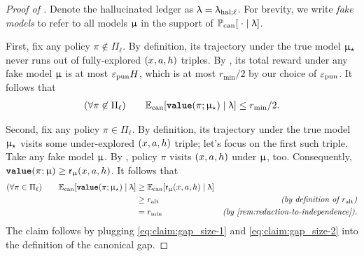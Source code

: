 \begin{proof}[Proof of ]
Denote the hallucinated ledger as $\uplambda = \uplambda_{\mathrm{hal};\ell}$. For brevity, we write \emph{fake models} to refer to all models $\upmu$ in the support of
    $\operatorname{\mathbb{P}}_{\mathrm{can}}[\;\cdot \mid \uplambda]$.

First, fix any policy $\pi\not\in \Pi_\ell$. By definition, its trajectory under the true model $\upmu_{\star}$ never runs out of fully-explored $(x,a,h)$ triples. By , its total reward under any fake model $\upmu$ is at most $\varepsilon_{\mathrm{pun}} H$, which is at most $r_{\min}/2$ by our choice of $\varepsilon_{\mathrm{pun}}$. It follows that
\begin{align}\label{eq:claim:gap_size-1}
(\forall \pi\not\in\Pi_\ell) \qquad
    \mathbb{E}_{\mathrm{can}}[{\normalfont \texttt{\textbf{value}}}(\pi;\upmu_{\star}) \mid \uplambda] \leq r_{\min}/2.
\end{align}

Second, fix any policy $\pi \in \Pi_{\ell}$. By definition, its trajectory under the true model $\upmu_{\star}$ visits some under-explored $(x,a,h)$ triple; let's focus on the first such triple. Take any fake model $\upmu$. By , policy $\pi$ visits $(x,a,h)$ under $\upmu$, too. Consequently,
    ${\normalfont \texttt{\textbf{value}}}(\pi;\upmu) \geq \mathsf{r}_{\upmu}(x,a,h)$.
It follows that
\begin{align}
(\forall \pi\in\Pi_\ell)\qquad
\Expcan[\valuef{\pi}{\modst} \mid \ledger]
    &\geq \Expcan[\sfr_{\model}(x,a,h) \mid \ledger] \nonumber \\
    &\geq \ralt
    &\EqComment{by definition of $\ralt$} \nonumber\\
    &= r_{\min}
    &\EqComment{by \Cref{rem:reduction-to-independence}}.
    \label{eq:claim:gap_size-2}
\end{align}
The claim follows by plugging \eqref{eq:claim:gap_size-1} and \eqref{eq:claim:gap_size-2} into the definition of the canonical gap.
\end{proof}
